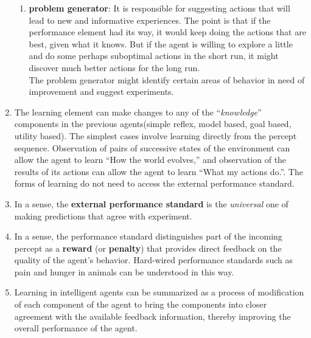 \begin{enumerate}[itemsep=0.2cm]
\begin{enumerate}[itemsep=0.1cm]
        \item \textbf{problem generator}: It is responsible for suggesting actions that will lead to new and informative experiences. The point is that if the performance element had its way, it would keep doing the actions that are best, given what it knows. But if the agent is willing to explore a little and do some perhaps suboptimal actions in the short run, it might discover much better actions for the long run. 
        \hfill \cite{ai/book/Artificial-Intelligence-A-Modern-Approach/Russell-Norvig}
        \\
        The problem generator might identify certain areas of behavior in need of improvement and suggest experiments.
        \hfill \cite{ai/book/Artificial-Intelligence-A-Modern-Approach/Russell-Norvig}
         
    \end{enumerate}

    \item The learning element can make changes to any of the “\textit{knowledge}” components in the previous agents(simple reflex, model based, goal based, utility based). The simplest cases involve learning directly from the percept sequence. Observation of pairs of successive states of the environment can allow the agent to learn “How the world evolves,” and observation of the results of its actions can allow the agent to learn “What my actions do.”.
    The forms of learning do not need to access the external performance standard.
    \hfill \cite{ai/book/Artificial-Intelligence-A-Modern-Approach/Russell-Norvig}


    \item In a sense, the \textbf{external performance standard} is the \textit{universal} one of making predictions that agree with experiment.
    \hfill \cite{ai/book/Artificial-Intelligence-A-Modern-Approach/Russell-Norvig}

    \item  In a sense, the performance standard distinguishes part of the incoming percept as a \textbf{reward} (or \textbf{penalty}) that provides direct feedback on the quality of the agent’s behavior. Hard-wired performance standards such as pain and hunger in animals can be understood in this way.
    \hfill \cite{ai/book/Artificial-Intelligence-A-Modern-Approach/Russell-Norvig}

    \item Learning in intelligent agents can be summarized as a process of modification of each component of the agent to bring the components into closer agreement with the available feedback information, thereby improving the overall performance of the agent.
    \hfill \cite{ai/book/Artificial-Intelligence-A-Modern-Approach/Russell-Norvig}

    
\end{enumerate}


